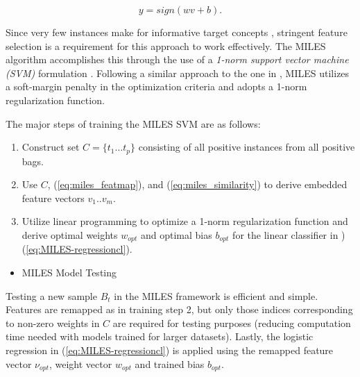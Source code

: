 \documentclass[12pt,dvips]{report}
\numberwithin{equation}{section}
\begin{document}
\begin{equation}
y=sign(wv+b).\label{eq:MILES-regressioncl}
\end{equation}


Since very few instances make for informative target concepts \cite{chen06_miles}, stringent feature selection is a requirement for this approach to work effectively. The MILES algorithm accomplishes this through the use of a \emph{1-norm support vector machine (SVM)} formulation \cite{chen06_miles}. Following a similar approach to the one in \cite{CorinnaCortes1995}, MILES utilizes a soft-margin penalty in the optimization criteria and adopts a 1-norm regularization function.

The major steps of training the MILES SVM are as follows: 
\begin{enumerate}
\item Construct set $C=\{t_{1}\ldots t_{p}\}$ consisting of all positive
instances from all positive bags.
\item Use $C$, (\ref{eq:miles_featmap}), and (\ref{eq:miles_similarity})
to derive embedded feature vectors $v_{1}..v_{m}$.
\item Utilize linear programming to optimize a 1-norm regularization function and derive optimal weights $w_{opt}$ and optimal bias $b_{opt}$ for the linear classifier in )(\ref{eq:MILES-regressioncl}).
\end{enumerate}

\begin{itemize}[leftmargin=12 pt]
\item MILES Model Testing
\end{itemize}


Testing a new sample $B_{t}$ in the MILES framework is efficient and simple. Features are remapped as in training step 2, but only those indices corresponding to non-zero weights in $C$ are required for testing purposes (reducing computation time needed with models trained for larger datasets). Lastly, the logistic regression in (\ref{eq:MILES-regressioncl}) is applied using the remapped feature vector $\nu_{opt}$, weight vector $w_{opt}$
and trained bias $b_{opt}$.
\end{document}
